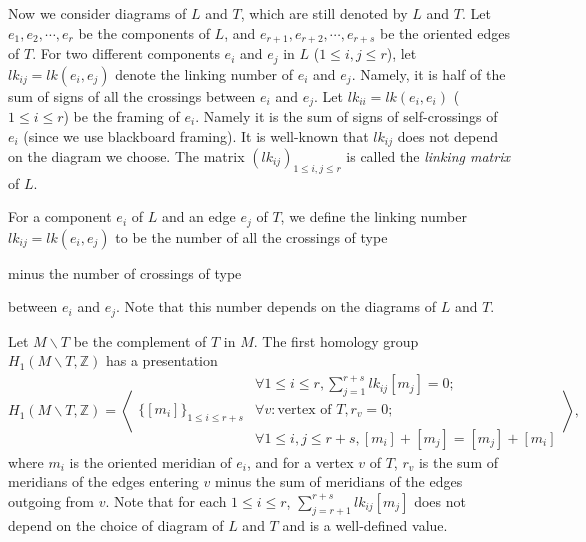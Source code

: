 \documentclass[12pt]{amsart}
\begin{document}
Now we consider diagrams of $L$ and $T$, which are still denoted by $L$ and $T$. Let $e_1, e_2, \cdots, e_r$ be the components of $L$, and $e_{r+1}, e_{r+2}, \cdots, e_{r+s}$ be the oriented edges of $T$. For two different components $e_i$ and $e_j$ in $L$ ($1 \leq i, j\leq r$), let $lk_{ij}=lk(e_i, e_j)$ denote the linking number of $e_i$ and $e_j$. Namely, it is half of the sum of signs of all the crossings between $e_i$ and $e_j$. Let $lk_{ii}=lk(e_i, e_i)$ ($1 \leq i \leq r$) be the framing of $e_i$. Namely it is the sum of signs of self-crossings of $e_i$ (since we use blackboard framing). It is well-known that $lk_{ij}$ does not depend on the diagram we choose. The matrix $(lk_{ij})_{1\leq i, j \leq r}$ is called the {\it linking matrix} of $L$. 

For a component $e_i$ of $L$ and an edge $e_j$ of $T$, we define the linking number $lk_{ij}=lk(e_i, e_j)$ to be the number of all the crossings of type  minus the number of crossings of type 
 between $e_i$ and $e_j$. Note that this number depends on the diagrams of $L$ and $T$.
 
Let $M\backslash T$ be the complement of $T$ in $M$. The first homology group $H_{1}(M\backslash T, \mathbb{Z})$ has a presentation
$$H_1(M\backslash T, \mathbb{Z})=\left <\begin{array}{l|l}
  & \forall 1\leq i \leq r,\sum_{j=1}^{r+s} lk_{ij}[m_j]=0;\\
\{ [m_i]\}_{1\leq i\leq r+s} & \forall v:\text{vertex of $T$}, r_v=0;\\
&\forall 1\leq i, j \leq r+s, [m_i]+[m_j]=[m_j]+[m_i]
\end{array}
\right >,
$$
where $m_i$ is the oriented meridian of $e_i$, and for a vertex $v$ of $T$, $r_v$ is the sum of meridians of the edges entering $v$ minus the sum of meridians of the edges outgoing from $v$. Note that for each $1\leq i \leq r$, $\sum_{j=r+1}^{r+s}lk_{ij}[m_j]$ does not depend on the choice of diagram of $L$ and $T$ and is a well-defined value.
\end{document}
